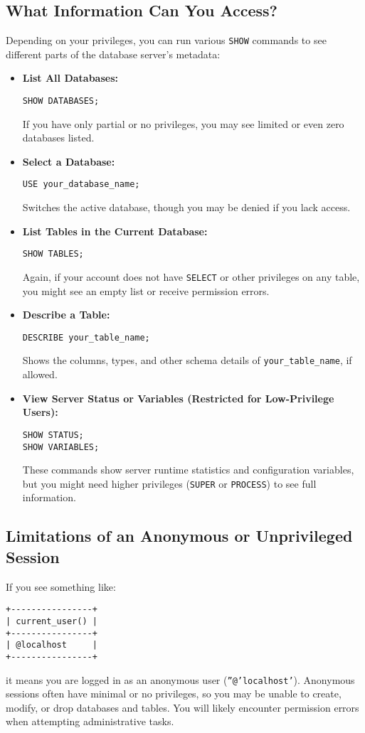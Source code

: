 \documentclass[10pt]{article}
\begin{document}
\subsection{What Information Can You Access?}
Depending on your privileges, you can run various \texttt{SHOW} commands to see different parts of the database server’s metadata:
\begin{itemize}
  \item \textbf{List All Databases:}
  \begin{verbatim}
SHOW DATABASES;
  \end{verbatim}
  If you have only partial or no privileges, you may see limited or even zero databases listed.

  \item \textbf{Select a Database:}
  \begin{verbatim}
USE your_database_name;
  \end{verbatim}
  Switches the active database, though you may be denied if you lack access.

  \item \textbf{List Tables in the Current Database:}
  \begin{verbatim}
SHOW TABLES;
  \end{verbatim}
  Again, if your account does not have \texttt{SELECT} or other privileges on any table, you might see an empty list or receive permission errors.

  \item \textbf{Describe a Table:}
  \begin{verbatim}
DESCRIBE your_table_name;
  \end{verbatim}
  Shows the columns, types, and other schema details of \texttt{your\_table\_name}, if allowed.

  \item \textbf{View Server Status or Variables (Restricted for Low-Privilege Users):}
  \begin{verbatim}
SHOW STATUS;
SHOW VARIABLES;
  \end{verbatim}
  These commands show server runtime statistics and configuration variables, but you might need higher privileges (\texttt{SUPER} or \texttt{PROCESS}) to see full information.
\end{itemize}

\subsection{Limitations of an Anonymous or Unprivileged Session}
If you see something like:
\begin{verbatim}
+----------------+
| current_user() |
+----------------+
| @localhost     |
+----------------+
\end{verbatim}
it means you are logged in as an anonymous user (\texttt{''@'localhost'}). Anonymous sessions often have minimal or no privileges, so you may be unable to create, modify, or drop databases and tables. You will likely encounter permission errors when attempting administrative tasks.
\end{document}
